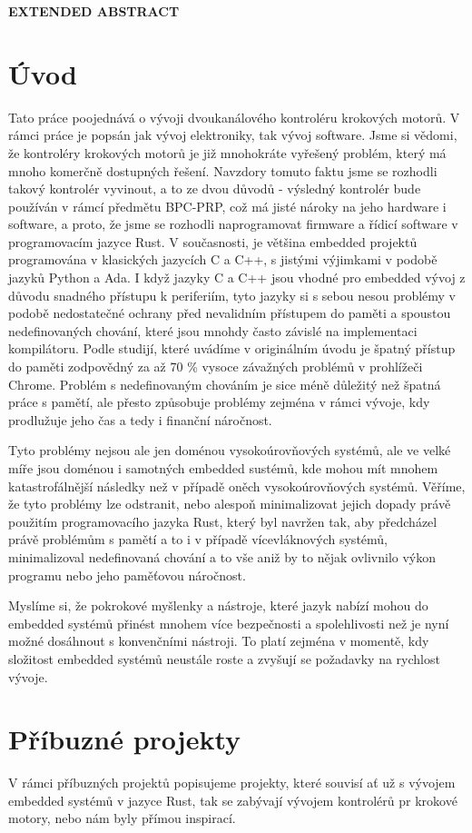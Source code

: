 \cleardoublepage
\noindent
{\large\sffamily\bfseries\MakeUppercase{Extended Abstract}}
\section*{Úvod}
Tato práce poojednává o vývoji dvoukanálového kontroléru krokových motorů.
V rámci práce je popsán jak vývoj elektroniky, tak vývoj software.
Jsme si vědomi, že kontroléry krokových motorů je již mnohokráte vyřešený problém, který má mnoho komerčně dostupných řešení.
Navzdory tomuto faktu jsme se rozhodli takový kontrolér vyvinout, a to ze dvou důvodů - výsledný kontrolér bude používán v rámcí předmětu BPC-PRP, což má jisté nároky na jeho hardware i software, a proto, že jsme se rozhodli naprogramovat firmware a řídicí software v programovacím jazyce Rust.
V současnosti, je většina embedded projektů programována v klasických jazycích C a C++, s jistými výjimkami v podobě jazyků Python a Ada.
I když jazyky C a C++ jsou vhodné pro embedded vývoj z důvodu snadného přístupu k periferiím, tyto jazyky si s sebou nesou problémy v podobě nedostatečné ochrany před nevalidním přístupem do paměti a spoustou nedefinovaných chování, které jsou mnohdy často závislé na implementaci kompilátoru.
Podle studijí, které uvádíme v originálním úvodu je špatný přístup do paměti zodpovědný za až 70 \% vysoce závažných problémů v prohlížeči Chrome.
Problém s nedefinovaným chováním je sice méně důležitý než špatná práce s pamětí, ale přesto způsobuje problémy zejména v rámci vývoje, kdy prodlužuje jeho čas a tedy i finanční náročnost.

Tyto problémy nejsou ale jen doménou vysokoúrovňových systémů, ale ve velké míře jsou doménou i samotných embedded sustémů, kde mohou mít mnohem katastrofálnější následky než v případě oněch vysokoúrovňových systémů.
Věříme, že tyto problémy lze odstranit, nebo alespoň minimalizovat jejich dopady právě použitím programovacího jazyka Rust, který byl navržen tak, aby předcházel právě problémům s pamětí a to i v případě vícevláknových systémů, minimalizoval nedefinovaná chování a to vše aniž by to nějak ovlivnilo výkon programu nebo jeho paměťovou náročnost.

Myslíme si, že pokrokové myšlenky a nástroje, které jazyk nabízí mohou do embedded systémů přinést mnohem více bezpečnosti a spolehlivosti než je nyní možné dosáhnout s konvenčními nástroji.
To platí zejména v momentě, kdy složitost embedded systémů neustále roste a zvyšují se požadavky na rychlost vývoje.

\section*{Příbuzné projekty}
V rámci příbuzných projektů popisujeme projekty, které souvisí ať už s vývojem embedded systémů v jazyce Rust, tak se zabývají vývojem kontrolérů pr krokové motory, nebo nám byly přímou inspirací.

